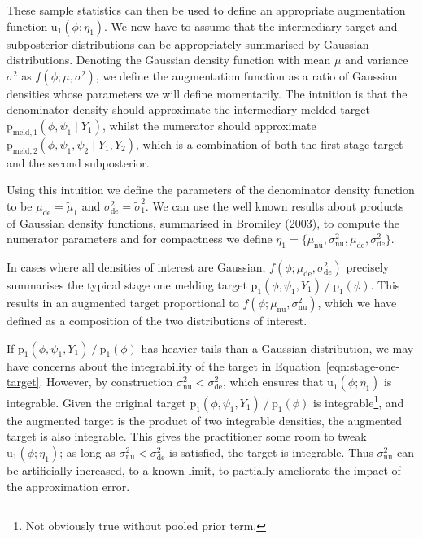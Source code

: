 \documentclass[10pt,a4paper,]{article}
\let\rmarkdownfootnote\footnote%
\def\footnote{\protect\rmarkdownfootnote}
\newcommand{\pd}{\text{p}}
\newcommand{\tarw}{\text{u}}
\begin{document}
These sample statistics can then be used to define an appropriate
augmentation function \(\tarw_{1}(\phi; \eta_{1})\). We now have to
assume that the intermediary target and subposterior distributions can
be appropriately summarised by Gaussian distributions. Denoting the
Gaussian density function with mean \(\mu\) and variance \(\sigma^2\) as
\(f(\phi; \mu, \sigma^2)\), we define the augmentation function as a
ratio of Gaussian densities
 whose
parameters we will define momentarily. The intuition is that the
denominator density should approximate the intermediary melded target
\(\pd_{\text{meld}, 1}(\phi, \psi_{1} \mid Y_{1})\), whilst the
numerator should approximate
\(\pd_{\text{meld}, 2}(\phi, \psi_{1}, \psi_{2} \mid Y_{1}, Y_{2})\),
which is a combination of both the first stage target and the second
subposterior.

Using this intuition we define the parameters of the denominator density
function to be \(\mu_{\text{de}} = \tilde{\mu}_{1}\) and
\(\sigma^{2}_{\text{de}} = \tilde{\sigma}^{2}_{1}\). We can use the well
known results about products of Gaussian density functions, summarised
in Bromiley (2003), to compute the numerator parameters
 and for compactness
we define
\(\eta_{1} = \{\mu_{\text{nu}}, \sigma^{2}_{\text{nu}}, \mu_{\text{de}}, \sigma^{2}_{\text{de}}\}\).

In cases where all densities of interest are Gaussian,
\(f(\phi; \mu_{\text{de}}, \sigma^2_{\text{de}})\) precisely summarises
the typical stage one melding target
\(\pd_{1}(\phi, \psi_{1}, Y_{1}) \mathop{/} \pd_{1}(\phi)\). This
results in an augmented target proportional to
\(f(\phi; \mu_{\text{nu}}, \sigma^2_{\text{nu}})\), which we have
defined as a composition of the two distributions of interest.

If \(\pd_{1}(\phi, \psi_{1}, Y_{1}) \mathop{/} \pd_{1}(\phi)\) has
heavier tails than a Gaussian distribution, we may have concerns about
the integrability of the target in
Equation~\eqref{eqn:stage-one-target}. However, by construction
\(\sigma_{\text{nu}}^{2} < \sigma_{\text{de}}^{2}\), which ensures that
\(\tarw_{1}(\phi; \eta_{1})\) is integrable. Given the original target
\(\pd_{1}(\phi, \psi_{1}, Y_{1}) \mathop{/} \pd_{1}(\phi)\) is
integrable\footnote{Not obviously true without pooled prior term.}, and
the augmented target is the product of two integrable densities, the
augmented target is also integrable. This gives the practitioner some
room to tweak \(\tarw_{1}(\phi; \eta_{1})\); as long as
\(\sigma_{\text{nu}}^{2} < \sigma_{\text{de}}^{2}\) is satisfied, the
target is integrable. Thus \(\sigma_{\text{nu}}^{2}\) can be
artificially increased, to a known limit, to partially ameliorate the
impact of the approximation error.
\end{document}
